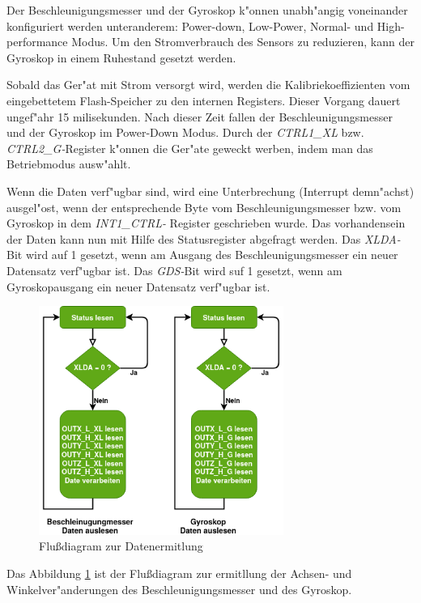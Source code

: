 Der Beschleunigungsmesser und der Gyroskop k"onnen unabh"angig 
voneinander konfiguriert werden unteranderem: Power-down, Low-Power, 
Normal- und High- performance Modus. Um den Stromverbrauch des Sensors 
zu reduzieren, kann der Gyroskop in einem Ruhestand gesetzt werden.


Sobald das Ger"at mit Strom versorgt wird, werden die 
Kalibriekoeffizienten vom eingebettetem Flash-Speicher zu den internen 
Registers. Dieser Vorgang dauert ungef"ahr 15 milisekunden. Nach dieser 
Zeit fallen der Beschleunigungsmesser und der Gyroskop im Power-Down 
Modus. Durch der \textit{CTRL1\_XL} bzw. \textit{CTRL2\_G-}Register 
k"onnen die Ger"ate geweckt werben, indem man das Betriebmodus 
ausw"ahlt.

Wenn die Daten verf"ugbar sind, wird eine Unterbrechung (Interrupt 
demn"achst) ausgel"ost, wenn der entsprechende Byte vom 
Beschleunigungsmesser bzw. vom Gyroskop in dem \textit{INT1\_CTRL-} 
Register geschrieben wurde. Das vorhandensein der Daten kann nun mit 
Hilfe des Statusregister abgefragt werden. Das \textit{XLDA-}Bit wird 
auf 1 gesetzt, wenn am Ausgang des Beschleunigungsmesser ein neuer 
Datensatz verf"ugbar ist. Das \textit{GDS-}Bit wird suf 1 gesetzt, wenn 
am Gyroskopausgang ein neuer Datensatz verf"ugbar ist.

\begin{figure}[h]
	\centering
	\includegraphics[width=8cm]{source/images/Gy_Acc_data}
	\caption{Flu\ss{}diagram zur Datenermitlung}\label{Gy_Acc_data}
\end{figure}

Das Abbildung \ref{Gy_Acc_data} ist der Flu\ss{}diagram zur ermitllung 
der Achsen- und Winkelver"anderungen des Beschleunigungsmesser und des 
Gyroskop.

\vspace{10cm}

